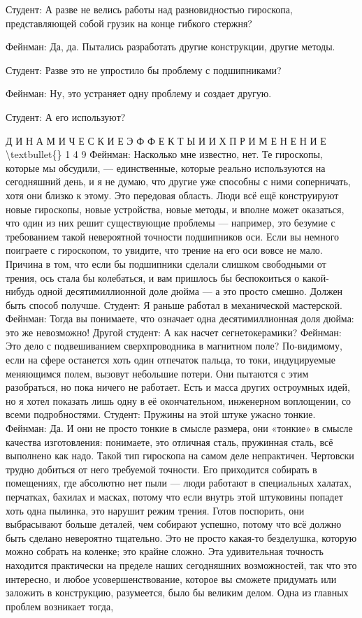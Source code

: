 \documentclass[10pt,oneside]{article}
\begin{document}
Студент: А разве не велись работы над разновидностью гироскопа, представляющей собой грузик на конце гибкого стержня?\par

Фейнман: Да, да. Пытались разработать другие конструкции, другие методы.\par

Студент: Разве это не упростило бы проблему с подшипниками?\par

Фейнман: Ну, это устраняет одну проблему и создает другую.\par

Студент: А его используют?\par

Д И Н А М И Ч Е С К И Е  Э Ф Ф Е К Т Ы  И  И Х  П Р И М Е Н Е Н И Е \textbackslash{}textbullet\{\} 1 4 9 Фейнман: Насколько мне известно, нет. Те гироскопы, которые мы обсудили, --- единственные, которые реально используются на сегодняшний день, и я не думаю, что другие уже способны с ними соперничать, хотя они близко к этому. Это передовая область. Люди всё ещё конструируют новые гироскопы, новые устройства, новые методы, и вполне может оказаться, что один из них решит существующие проблемы --- например, это безумие с требованием такой невероятной точности подшипников оси. Если вы немного поиграете с гироскопом, то увидите, что трение на его оси вовсе не мало. Причина в том, что если бы подшипники сделали слишком свободными от трения, ось стала бы колебаться, и вам пришлось бы беспокоиться о какой-нибудь одной десятимиллионной доле дюйма --- а это просто смешно. Должен быть способ получше. Студент: Я раньше работал в механической мастерской. Фейнман: Тогда вы понимаете, что означает одна десятимиллионная доля дюйма: это же невозможно! Другой студент: А как насчет сегнетокерамики? Фейнман: Это дело с подвешиванием сверхпроводника в магнитном поле? По-видимому, если на сфере останется хоть один отпечаток пальца, то токи, индуцируемые меняющимся полем, вызовут небольшие потери. Они пытаются с этим разобраться, но пока ничего не работает. Есть и масса других остроумных идей, но я хотел показать лишь одну в её окончательном, инженерном воплощении, со всеми подробностями. Студент: Пружины на этой штуке ужасно тонкие. Фейнман: Да. И они не просто тонкие в смысле размера, они «тонкие» в смысле качества изготовления: понимаете, это отличная сталь, пружинная сталь, всё выполнено как надо. Такой тип гироскопа на самом деле непрактичен. Чертовски трудно добиться от него требуемой точности. Его приходится собирать в помещениях, где абсолютно нет пыли --- люди работают в специальных халатах, перчатках, бахилах и масках, потому что если внутрь этой штуковины попадет хоть одна пылинка, это нарушит режим трения. Готов поспорить, они выбрасывают больше деталей, чем собирают успешно, потому что всё должно быть сделано невероятно тщательно. Это не просто какая-то безделушка, которую можно собрать на коленке; это крайне сложно. Эта удивительная точность находится практически на пределе наших сегодняшних возможностей, так что это интересно, и любое усовершенствование, которое вы сможете придумать или заложить в конструкцию, разумеется, было бы великим делом. Одна из главных проблем возникает тогда, 
\end{document}
